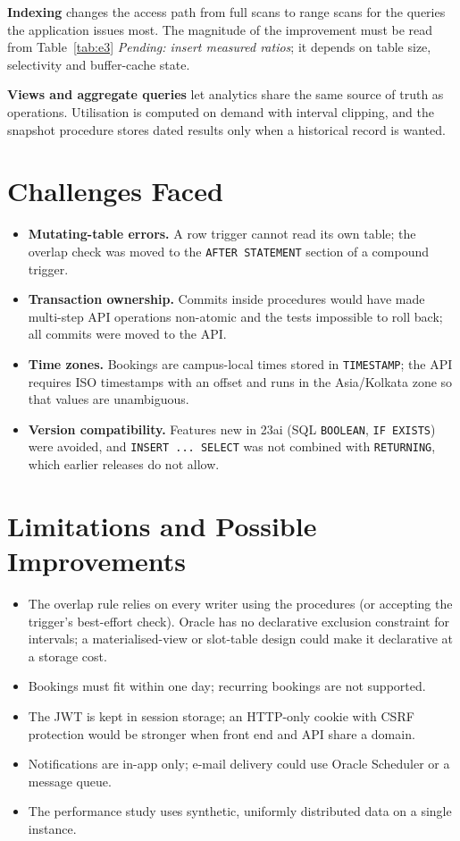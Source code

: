 \documentclass[12pt,a4paper,oneside]{report}
\newcommand{\pending}[1]{\textcolor{black!55}{\textit{Pending: #1}}}
\renewcommand{\_}{\origus\allowbreak}
\begin{document}
\textbf{Indexing} changes the access path from full scans to range scans for the queries the application issues most. The magnitude of the improvement must be read from Table~\ref{tab:e3} \pending{insert measured ratios}; it depends on table size, selectivity and buffer-cache state.

\textbf{Views and aggregate queries} let analytics share the same source of truth as operations. Utilisation is computed on demand with interval clipping, and the snapshot procedure stores dated results only when a historical record is wanted.

\section{Challenges Faced}
\begin{itemize}
  \item \textbf{Mutating-table errors.} A row trigger cannot read its own table; the overlap check was moved to the \texttt{AFTER STATEMENT} section of a compound trigger.
  \item \textbf{Transaction ownership.} Commits inside procedures would have made multi-step API operations non-atomic and the tests impossible to roll back; all commits were moved to the API.
  \item \textbf{Time zones.} Bookings are campus-local times stored in \texttt{TIMESTAMP}; the API requires ISO timestamps with an offset and runs in the Asia/Kolkata zone so that values are unambiguous.
  \item \textbf{Version compatibility.} Features new in 23ai (SQL \texttt{BOOLEAN}, \texttt{IF EXISTS}) were avoided, and \texttt{INSERT~...~SELECT} was not combined with \texttt{RETURNING}, which earlier releases do not allow.
\end{itemize}

\section{Limitations and Possible Improvements}
\begin{itemize}
  \item The overlap rule relies on every writer using the procedures (or accepting the trigger's best-effort check). Oracle has no declarative exclusion constraint for intervals; a materialised-view or slot-table design could make it declarative at a storage cost.
  \item Bookings must fit within one day; recurring bookings are not supported.
  \item The JWT is kept in session storage; an HTTP-only cookie with CSRF protection would be stronger when front end and API share a domain.
  \item Notifications are in-app only; e-mail delivery could use Oracle Scheduler or a message queue.
  \item The performance study uses synthetic, uniformly distributed data on a single instance.
\end{itemize}
\end{document}
